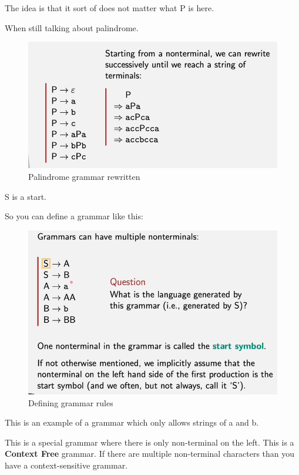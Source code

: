\documentclass[
  11pt,
  british,
]{article}
\begin{document}
The idea is that it sort of does not matter what P is here.

When still talking about palindrome.

\begin{figure}
\centering
\includegraphics{Pasted_image_20211127130856.png}
\caption{Palindrome grammar rewritten}
\end{figure}

S is a start.

So you can define a grammar like this:

\begin{figure}
\centering
\includegraphics{Pasted_image_20211127131455.png}
\caption{Defining grammar rules}
\end{figure}

This is an example of a grammar which only allows strings of a and b.

This is a special grammar where there is only non-terminal on the left.
This is a \textbf{Context Free} grammar. If there are multiple
non-terminal characters than you have a context-sensitive grammar.
\end{document}
